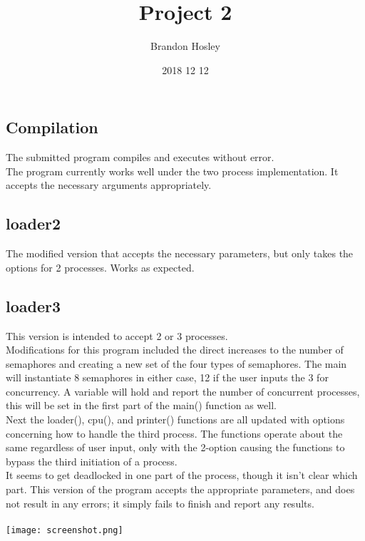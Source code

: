 \documentclass[a4paper,man,natbib]{apa6}
\title{Project 2}
\author{Brandon Hosley}
\date{2018 12 12}
\affiliation{Chung-Wei Lee}
\begin{document}
\maketitle
\raggedbottom
\subsection{Compilation}
The submitted program compiles and executes without error. \\
The program currently works well under the two process implementation. It accepts the necessary arguments appropriately.
 
\subsection{loader2}
The modified version that accepts the necessary parameters, but only takes the options for 2 processes.
Works as expected.

\subsection{loader3}
This version is intended to accept 2 or 3 processes. \\
Modifications for this program included the direct increases to the number of semaphores and creating a new set of the four types of semaphores.
The main will instantiate 8 semaphores in either case, 12 if the user inputs the 3 for concurrency. A variable will hold and report the number of concurrent processes, this will be set in the first part of the main() function as well.\\
Next the loader(), cpu(), and printer() functions are all updated with options concerning how to handle the third process. The functions operate about the same regardless of user input, only with the 2-option causing the functions to bypass the third initiation of a process. \\

It seems to get deadlocked in one part of the process, though it isn't clear which part.
This version of the program accepts the appropriate parameters, and does not result in any errors;
it simply fails to finish and report any results. \\~\\

\texttt{[image: screenshot.png]}

%
\end{document}
